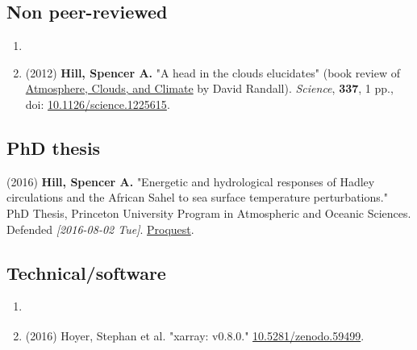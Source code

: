 \documentclass{article}
\begin{document}
\subsection*{Non peer-reviewed}
\label{sec:org9fd5f04}
\begin{enumerate}
\item {}

\item (2012) \textbf{Hill, Spencer A.} "A head in the clouds elucidates" (book review of
\href{http://press.princeton.edu/titles/9773.html}{Atmosphere, Clouds, and Climate} by David Randall). \emph{Science}, \textbf{337}, 1 pp., doi:
\href{http://dx.doi.org/10.1126/science.1225615}{10.1126/science.1225615}.
\end{enumerate}
\subsection*{PhD thesis}
\label{sec:org79dacb5}

(2016) \textbf{Hill, Spencer A.} "Energetic and hydrological responses of Hadley
circulations and the African Sahel to sea surface temperature perturbations."
PhD Thesis, Princeton University Program in Atmospheric and Oceanic Sciences.
Defended \textit{[2016-08-02 Tue]}.  \href{http://search.proquest.com.ezproxy.princeton.edu/pqdtglobal/docview/1831357756/abstract/522E2D42A8BF49C0PQ/1}{Proquest}.
\subsection*{Technical/software}
\label{sec:org397a178}
\begin{enumerate}
\item \cite{hoyer_xarray:_2016}
\item (2016) Hoyer, Stephan et al.  "xarray: v0.8.0."  \href{http://dx.doi.org/10.5281/zenodo.59499}{10.5281/zenodo.59499}.
\end{enumerate}

\end{document}
